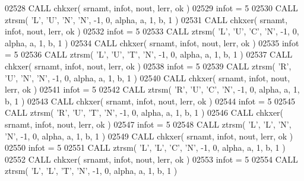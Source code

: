 \begin{DoxyCode}
02528       \textcolor{keyword}{CALL }chkxer( srnamt, infot, nout, lerr, ok )
02529       infot = 5
02530       \textcolor{keyword}{CALL }ztrsm( \textcolor{stringliteral}{'L'}, \textcolor{stringliteral}{'U'}, \textcolor{stringliteral}{'N'}, \textcolor{stringliteral}{'N'}, -1, 0, alpha, a, 1, b, 1 )
02531       \textcolor{keyword}{CALL }chkxer( srnamt, infot, nout, lerr, ok )
02532       infot = 5
02533       \textcolor{keyword}{CALL }ztrsm( \textcolor{stringliteral}{'L'}, \textcolor{stringliteral}{'U'}, \textcolor{stringliteral}{'C'}, \textcolor{stringliteral}{'N'}, -1, 0, alpha, a, 1, b, 1 )
02534       \textcolor{keyword}{CALL }chkxer( srnamt, infot, nout, lerr, ok )
02535       infot = 5
02536       \textcolor{keyword}{CALL }ztrsm( \textcolor{stringliteral}{'L'}, \textcolor{stringliteral}{'U'}, \textcolor{stringliteral}{'T'}, \textcolor{stringliteral}{'N'}, -1, 0, alpha, a, 1, b, 1 )
02537       \textcolor{keyword}{CALL }chkxer( srnamt, infot, nout, lerr, ok )
02538       infot = 5
02539       \textcolor{keyword}{CALL }ztrsm( \textcolor{stringliteral}{'R'}, \textcolor{stringliteral}{'U'}, \textcolor{stringliteral}{'N'}, \textcolor{stringliteral}{'N'}, -1, 0, alpha, a, 1, b, 1 )
02540       \textcolor{keyword}{CALL }chkxer( srnamt, infot, nout, lerr, ok )
02541       infot = 5
02542       \textcolor{keyword}{CALL }ztrsm( \textcolor{stringliteral}{'R'}, \textcolor{stringliteral}{'U'}, \textcolor{stringliteral}{'C'}, \textcolor{stringliteral}{'N'}, -1, 0, alpha, a, 1, b, 1 )
02543       \textcolor{keyword}{CALL }chkxer( srnamt, infot, nout, lerr, ok )
02544       infot = 5
02545       \textcolor{keyword}{CALL }ztrsm( \textcolor{stringliteral}{'R'}, \textcolor{stringliteral}{'U'}, \textcolor{stringliteral}{'T'}, \textcolor{stringliteral}{'N'}, -1, 0, alpha, a, 1, b, 1 )
02546       \textcolor{keyword}{CALL }chkxer( srnamt, infot, nout, lerr, ok )
02547       infot = 5
02548       \textcolor{keyword}{CALL }ztrsm( \textcolor{stringliteral}{'L'}, \textcolor{stringliteral}{'L'}, \textcolor{stringliteral}{'N'}, \textcolor{stringliteral}{'N'}, -1, 0, alpha, a, 1, b, 1 )
02549       \textcolor{keyword}{CALL }chkxer( srnamt, infot, nout, lerr, ok )
02550       infot = 5
02551       \textcolor{keyword}{CALL }ztrsm( \textcolor{stringliteral}{'L'}, \textcolor{stringliteral}{'L'}, \textcolor{stringliteral}{'C'}, \textcolor{stringliteral}{'N'}, -1, 0, alpha, a, 1, b, 1 )
02552       \textcolor{keyword}{CALL }chkxer( srnamt, infot, nout, lerr, ok )
02553       infot = 5
02554       \textcolor{keyword}{CALL }ztrsm( \textcolor{stringliteral}{'L'}, \textcolor{stringliteral}{'L'}, \textcolor{stringliteral}{'T'}, \textcolor{stringliteral}{'N'}, -1, 0, alpha, a, 1, b, 1 )

\end{DoxyCode}
